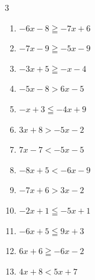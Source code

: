 \begin{multicols}{3}
\begin{enumerate}

  \item $-6x-8\geqq -7x+6$

        \phantom{$\displaystyle x\geqq 14$}

  \item $-7x-9\geqq -5x-9$

        \phantom{$\displaystyle x\leqq 0$}

  \item $-3x+5\geqq -x-4$


  \item $-5x-8>6x-5$


  \item $-x+3\leqq -4x+9$

        \phantom{$\displaystyle x\leqq 2$}

  \item $3x+8>-5x-2$


  \item $7x-7<-5x-5$


  \item $-8x+5<-6x-9$

        \phantom{$\displaystyle x>7$}

  \item $-7x+6>3x-2$


  \item $-2x+1\leqq -5x+1$

        \phantom{$\displaystyle x\leqq 0$}

  \item $-6x+5\leqq 9x+3$


  \item $6x+6\geqq -6x-2$


\columnbreak %

  \item $4x+8<5x+7$

        \phantom{$\displaystyle x>1$}


\end{enumerate}
\end{multicols}
